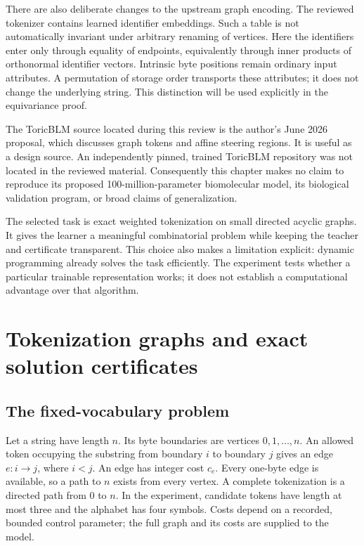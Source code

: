 There are also deliberate changes to the upstream graph encoding. The
reviewed tokenizer contains learned identifier embeddings. Such a table is
not automatically invariant under arbitrary renaming of vertices. Here the
identifiers enter only through equality of endpoints, equivalently through
inner products of orthonormal identifier vectors. Intrinsic byte positions
remain ordinary input attributes. A permutation of storage order transports
these attributes; it does not change the underlying string. This distinction
will be used explicitly in the equivariance proof.

The ToricBLM source located during this review is the author's June 2026
proposal, which discusses graph tokens and affine steering regions. It is
useful as a design source. An independently pinned, trained ToricBLM
repository was not located in the reviewed material. Consequently this
chapter makes no claim to reproduce its proposed 100-million-parameter
biomolecular model, its biological validation program, or broad claims of
generalization.\cite{qtToricBLM}

The selected task is exact weighted tokenization on small directed acyclic
graphs. It gives the learner a meaningful combinatorial problem while
keeping the teacher and certificate transparent. This choice also makes a
limitation explicit: dynamic programming already solves the task efficiently.
The experiment tests whether a particular trainable representation works;
it does not establish a computational advantage over that algorithm.

\section{Tokenization graphs and exact solution certificates}

\subsection{The fixed-vocabulary problem}

Let a string have length $n$. Its byte boundaries are vertices
$0,1,\ldots,n$. An allowed token occupying the substring from boundary $i$
to boundary $j$ gives an edge $e:i\to j$, where $i<j$. An edge has integer
cost $c_e$. Every one-byte edge is available, so a path to $n$ exists from
every vertex. A complete tokenization is a directed path from $0$ to $n$.
In the experiment, candidate tokens have length at most three and the
alphabet has four symbols. Costs depend on a recorded, bounded control
parameter; the full graph and its costs are supplied to the model.

